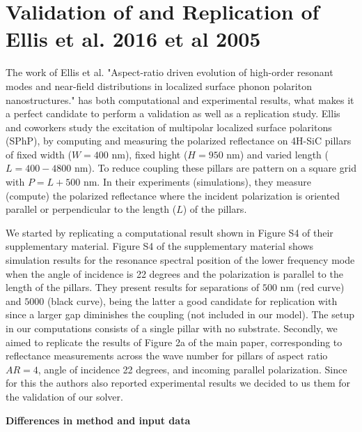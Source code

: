 
\section{Validation of \pygbe and Replication of Ellis et al. 2016  et al 2005} \label{chap:rep_val_ellis}
\graphicspath{{replication_validation/figs/}}

The work of Ellis et al. "Aspect-ratio driven evolution of high-order resonant modes and near-field distributions in
localized surface phonon polariton nanostructures." \cite{ellis2016} has both computational and experimental results, what makes 
it a perfect candidate to perform a validation as well as a replication study. Ellis and coworkers study the excitation of 
multipolar localized surface polaritons (SPhP), by computing and measuring the polarized reflectance on 4H-SiC pillars of
fixed width ($W = 400$ nm), fixed hight ($H=950$ nm) and varied length ($L=400-4800$ nm). To reduce coupling these pillars are 
pattern on a square grid with $P = L + 500$ nm. In their experiments (simulations), they measure (compute) the polarized reflectance
where the incident polarization is oriented parallel or perpendicular to the length ($L$) of the pillars.

We started by replicating a computational result shown in Figure S4 of their supplementary material. Figure S4 of the 
supplementary material shows simulation results for the resonance spectral position of the lower frequency mode when the angle of 
incidence is 22 degrees and the polarization is parallel to the length of the pillars. They present results for separations of $500$ nm 
(red curve) and $5000$ (black curve), being the latter a good candidate for replication with \pygbe since a larger gap diminishes 
the coupling (not included in our model). The setup in our computations consists of a single pillar with no substrate.
Secondly, we aimed to replicate the results of Figure 2a of the main paper, 
corresponding to reflectance measurements across the wave number for pillars of aspect ratio $AR=4$, angle of incidence 22 degrees, 
and incoming parallel polarization. Since for this the authors also reported experimental results we decided to us them for the 
validation of our solver.

\textbf{Differences in method and input data}

